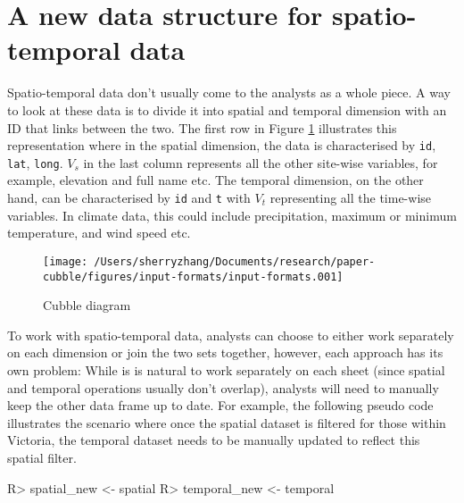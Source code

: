 \documentclass[
]{jss}
\begin{document}
\newpage

\hypertarget{a-new-data-structure-for-spatio-temporal-data}{%
\section{A new data structure for spatio-temporal
data}\label{a-new-data-structure-for-spatio-temporal-data}}

Spatio-temporal data don't usually come to the analysts as a whole
piece. A way to look at these data is to divide it into spatial and
temporal dimension with an ID that links between the two. The first row
in Figure \ref{fig:cubble-diagram} illustrates this representation where
in the spatial dimension, the data is characterised by \texttt{id},
\texttt{lat}, \texttt{long}. \(V_s\) in the last column represents all
the other site-wise variables, for example, elevation and full name etc.
The temporal dimension, on the other hand, can be characterised by
\texttt{id} and \texttt{t} with \(V_t\) representing all the time-wise
variables. In climate data, this could include precipitation, maximum or
minimum temperature, and wind speed etc.

\begin{CodeChunk}
\begin{figure}

{\centering \texttt{[image: /Users/sherryzhang/Documents/research/paper-cubble/figures/input-formats/input-formats.001]} 

}

\caption[Cubble diagram]{Cubble diagram}\label{fig:cubble-diagram}
\end{figure}
\end{CodeChunk}

To work with spatio-temporal data, analysts can choose to either work
separately on each dimension or join the two sets together, however,
each approach has its own problem: While is is natural to work
separately on each sheet (since spatial and temporal operations usually
don't overlap), analysts will need to manually keep the other data frame
up to date. For example, the following pseudo code illustrates the
scenario where once the spatial dataset is filtered for those within
Victoria, the temporal dataset needs to be manually updated to reflect
this spatial filter.

\begin{CodeChunk}
\begin{CodeInput}
R> spatial_new <- spatial %
R> temporal_new <- temporal %
\end{CodeInput}
\end{CodeChunk}
\end{document}
